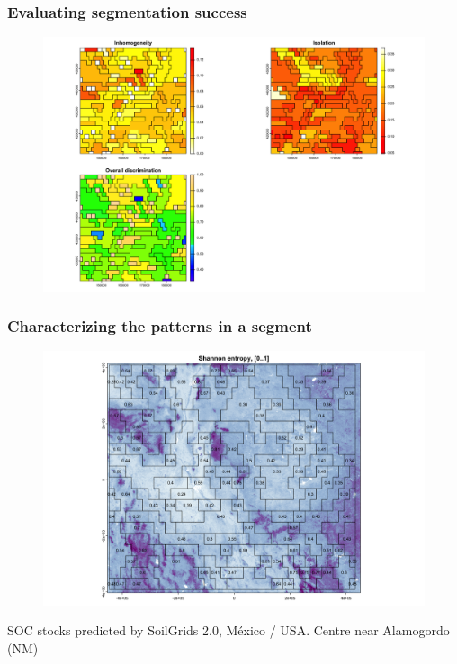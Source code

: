 \documentclass[aspectratio=169, 10pt]{beamer}
\begin{document}
 \begin{frame}
        \frametitle{Evaluating segmentation success}
    \begin{figure}
        \centering        \includegraphics[height=0.7\textheight]{graphics_david/all-files-resolutions-4.png}
      \end{figure}
  \end{frame}

  \begin{frame}
    \frametitle{Characterizing the patterns in a segment}
    \begin{figure}
        \centering        \includegraphics[height=0.6\textheight]{graphics_david/compute-sg-nm-8M-3.png}
      \end{figure}
      {\footnotesize SOC stocks predicted by SoilGrids 2.0, M\'{e}xico / USA. Centre near Alamogordo (NM)}
  \end{frame}
  
\end{document}
